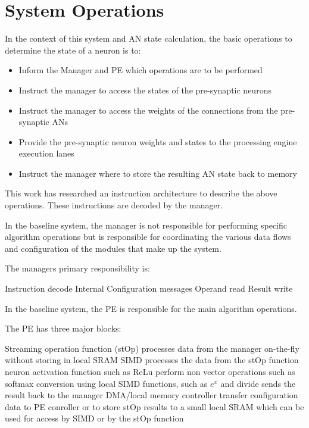\documentclass[journal]{IEEEtran}
\begin{document}
\section{System Operations}
\label{sec:System Operations}
In the context of this system and AN state calculation, the basic operations to determine the state of a neuron is to:

\begin{itemize}
    \item Inform the Manager and PE which operations are to be performed
    \item Instruct the manager to access the states of the pre-synaptic neurons
    \item Instruct the manager to access the weights of the connections from the pre-synaptic ANs
    \item Provide the pre-synaptic neuron weights and states to the processing engine execution lanes
    \item Instruct the manager where to store the resulting AN state back to memory
\end{itemize}

This work has researched an instruction architecture to describe the above operations. 
These instructions are decoded by the manager. 

In the baseline system, the manager is not responsible for performing specific algorithm operations but is responsible for coordinating the various data flows and configuration of the modules that make up the system.

The managers primary responsibility is:

\begin{outline}
    \1 Instruction decode
    \1 Internal Configuration messages
    \1 Operand read
    \1 Result write
\end{outline}

In the baseline system, the PE is responsible for the main algorithm operations.

The PE has three major blocks:

\begin{outline}
    \1 Streaming operation function (stOp)
      \2 processes data from the manager on-the-fly without storing in local SRAM
    \1 SIMD
      \2 processes the data from the stOp function
        \3 neuron activation function such as ReLu
        \3 perform non vector operations such as softmax conversion using local SIMD functions, such as $e^x$ and divide
      \2 sends the result back to the manager
    \1 DMA/local memory controller
      \2 transfer configuration data to PE conroller or to store stOp results to a small local SRAM which can be used for access by SIMD or by the stOp function
\end{outline}
\end{document}
